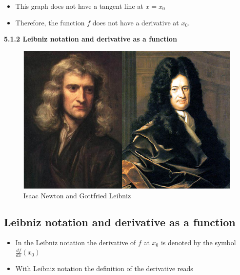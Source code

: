 \documentclass[]{book}
\providecommand{\tightlist}{%
  \setlength{\itemsep}{0pt}\setlength{\parskip}{0pt}}
\begin{document}
\begin{itemize}
\tightlist
\item
  This graph does not have a tangent line at \(x=x_{0}\)
\item
  Therefore, the function \(f\) does not have a derivative at \(x_{0}\).
\end{itemize}

\newpage

\textbf{5.1.2 Leibniz notation and derivative as a function}

\begin{figure}

{\centering \includegraphics[width=1\linewidth]{figure/5Derivatives-13} 

}

\caption{Isaac Newton and Gottfried Leibniz}\label{fig:unnamed-chunk-10}
\end{figure}

\newpage

\hypertarget{leibniz-notation-and-derivative-as-a-function}{%
\subsection{Leibniz notation and derivative as a function}\label{leibniz-notation-and-derivative-as-a-function}}

\begin{itemize}
\item
  In the Leibniz notation the derivative of \(f\) at \(x_0\) is denoted by the symbol \(\frac{df}{dx}(x_0)\)
\item
  With Leibniz notation the definition of the derivative reads
\end{itemize}
\end{document}
